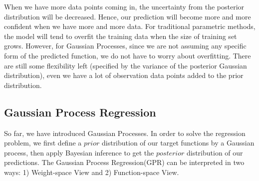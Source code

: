 \documentclass[11pt,a4paper]{article}
\theoremstyle{definition}
\numberwithin{equation}{section}
\begin{document}
	When we have more data points coming in, the uncertainty from the posterior distribution will be decreased. Hence, our prediction will become more and more confident when we have more and more data. For traditional parametric methods, the model will tend to overfit the training data when the size of training set grows. However, for Gaussian Processes, since we are not assuming any specific form of the predicted function, we do not have to worry about overfitting. There are still some flexibility left (specified by the variance of the posterior Gaussian distribution), even we have a lot of observation data points added to the  prior distribution. 
	
	\subsection{Gaussian Process Regression}
	So far, we have introduced Gaussian Processes. In order to solve the regression problem, we first define a $prior$ distribution of our target functions by a Gaussian process, then apply Bayesian inference to get the $posterior$ distribution of our predictions. The Gaussian Process Regression(GPR) can be interpreted in two ways: 1) Weight-space View and 2) Function-space View.
	
\end{document}
